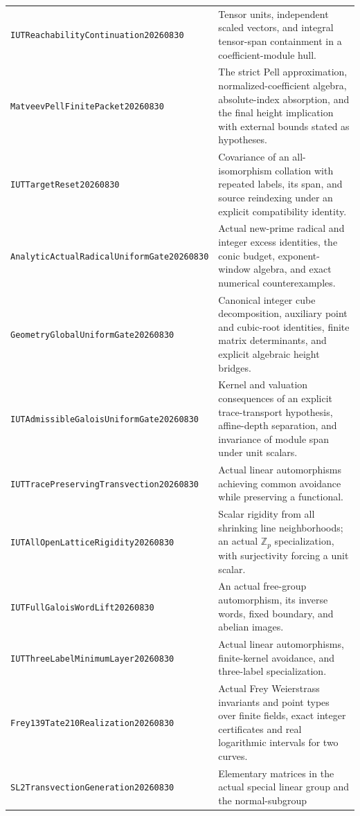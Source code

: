 \documentclass[11pt]{amsart}
\theoremstyle{definition}
\theoremstyle{remark}
\newcommand{\Z}{\mathbb Z}
\begin{document}
\begin{longtable}{>{\raggedright\arraybackslash}p{}>{\raggedright\arraybackslash}p{}}
\texttt{IUTReachability\allowbreak Continuation20260830} & Tensor units,
independent scaled vectors, and integral tensor-span containment in a
coefficient-module hull.\\[3pt]
\texttt{MatveevPellFinitePacket20260830} & The strict Pell approximation,
normalized-coefficient algebra, absolute-index absorption, and the final
height implication with external bounds stated as hypotheses.\\[3pt]
\texttt{IUTTargetReset20260830} & Covariance of an all-isomorphism
collation with repeated labels, its span, and source reindexing under an
explicit compatibility identity.\\[3pt]
\texttt{AnalyticActualRadical\allowbreak UniformGate20260830} & Actual new-prime
radical and integer excess identities, the conic budget, exponent-window
algebra, and exact numerical counterexamples.\\[3pt]
\texttt{GeometryGlobal\allowbreak UniformGate20260830} & Canonical integer cube
decomposition, auxiliary point and cubic-root identities, finite matrix
determinants, and explicit algebraic height bridges.\\[3pt]
\texttt{IUTAdmissibleGalois\allowbreak UniformGate20260830} & Kernel and valuation
consequences of an explicit trace-transport hypothesis, affine-depth
separation, and invariance of module span under unit scalars.\\[3pt]
\texttt{IUTTracePreserving\allowbreak Transvection20260830} & Actual linear
automorphisms achieving common avoidance while preserving a functional.\\[3pt]
\texttt{IUTAllOpenLattice\allowbreak Rigidity20260830} & Scalar rigidity from
all shrinking line neighborhoods; an actual $\Z_p$ specialization, with
surjectivity forcing a unit scalar.\\[3pt]
\texttt{IUTFullGalois\allowbreak WordLift20260830} & An actual free-group
automorphism, its inverse words, fixed boundary, and abelian images.\\[3pt]
\texttt{IUTThreeLabel\allowbreak MinimumLayer20260830} & Actual linear
automorphisms, finite-kernel avoidance, and three-label specialization.\\[3pt]
\texttt{Frey139Tate210\allowbreak Realization20260830} & Actual Frey
Weierstrass invariants and point types over finite fields, exact integer
certificates and real logarithmic intervals for two curves.\\[3pt]
\texttt{SL2Transvection\allowbreak Generation20260830} & Elementary
matrices in the actual special linear group and the normal-subgroup

\end{longtable}
\end{document}

